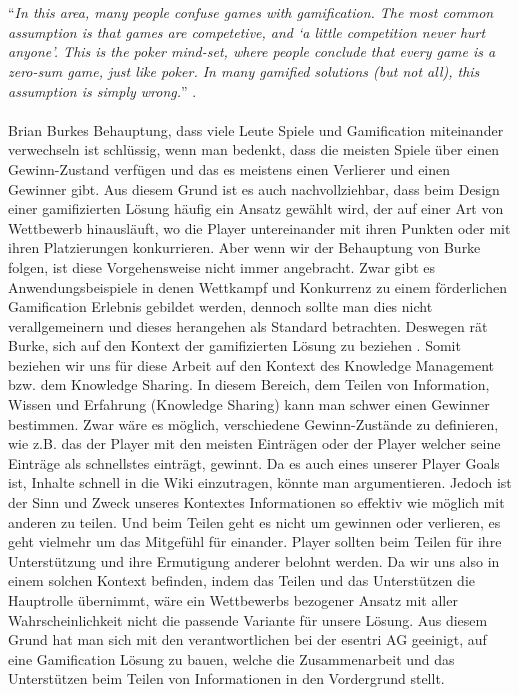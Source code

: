 \documentclass[a4paper,12pt,twoside]{scrartcl}
\begin{document}
\\\\
\enquote{\textit{In this area, many people confuse games with gamification. The most common assumption is that games are competetive, and \enquote{a little competition never hurt anyone}. This is the poker mind-set, where people conclude that every game is a zero-sum game, just like poker. In many gamified solutions (but not all), this assumption is simply wrong.}} \cite{gamificationDefinition}. 
\\\\
Brian Burkes Behauptung, dass viele Leute Spiele und Gamification miteinander verwechseln ist schlüssig, wenn man bedenkt, dass die meisten Spiele über einen Gewinn-Zustand verfügen und das es meistens einen Verlierer und einen Gewinner gibt. Aus diesem Grund ist es auch nachvollziehbar, dass beim Design einer gamifizierten Lösung häufig ein Ansatz gewählt wird, der auf einer Art von Wettbewerb hinausläuft, wo die Player untereinander mit ihren Punkten oder mit ihren Platzierungen konkurrieren. Aber wenn wir der Behauptung von Burke folgen, ist diese Vorgehensweise nicht immer angebracht. Zwar gibt es Anwendungsbeispiele in denen Wettkampf und Konkurrenz zu einem förderlichen Gamification Erlebnis gebildet werden, dennoch sollte man dies nicht verallgemeinern und dieses herangehen als Standard betrachten. Deswegen rät Burke, sich auf den Kontext der gamifizierten Lösung zu beziehen \cite{gamificationDefinition}. Somit beziehen wir uns für diese Arbeit auf den Kontext des Knowledge Management bzw. dem Knowledge Sharing. In diesem Bereich, dem Teilen von Information, Wissen und Erfahrung (Knowledge Sharing) kann man schwer einen Gewinner bestimmen. Zwar wäre es möglich, verschiedene Gewinn-Zustände zu definieren, wie z.B. das der Player mit den meisten Einträgen oder der Player welcher seine Einträge als schnellstes einträgt, gewinnt. Da es auch eines unserer Player Goals ist, Inhalte schnell in die Wiki einzutragen, könnte man argumentieren. Jedoch ist der Sinn und Zweck unseres Kontextes Informationen so effektiv wie möglich mit anderen zu teilen. Und beim Teilen geht es nicht um gewinnen oder verlieren, es geht vielmehr um das Mitgefühl für einander. Player sollten beim Teilen für ihre Unterstützung und ihre Ermutigung anderer belohnt werden. Da wir uns also in einem solchen Kontext befinden, indem das Teilen und das Unterstützen die Hauptrolle übernimmt, wäre ein Wettbewerbs bezogener Ansatz mit aller Wahrscheinlichkeit nicht die passende Variante für unsere Lösung. Aus diesem Grund hat man sich mit den verantwortlichen bei der esentri AG geeinigt, auf eine Gamification Lösung zu bauen, welche die Zusammenarbeit und das Unterstützen beim Teilen von Informationen in den Vordergrund stellt.
\end{document}
